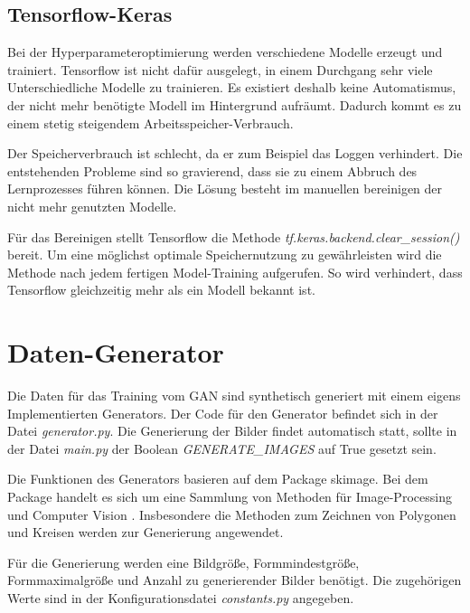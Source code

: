 \subsection{Tensorflow-Keras}
Bei der Hyperparameteroptimierung werden verschiedene Modelle erzeugt und trainiert.
Tensorflow ist nicht dafür ausgelegt, in einem Durchgang sehr viele Unterschiedliche Modelle zu trainieren.
Es existiert deshalb keine Automatismus, der nicht mehr benötigte Modell im Hintergrund aufräumt.
Dadurch kommt es zu einem stetig steigendem Arbeitsspeicher-Verbrauch.
\newline

Der Speicherverbrauch ist schlecht, da er zum Beispiel das Loggen verhindert.
Die entstehenden Probleme sind so gravierend, dass sie zu einem Abbruch des Lernprozesses führen können.
Die Lösung besteht im manuellen bereinigen der nicht mehr genutzten Modelle.
\newline

Für das Bereinigen stellt Tensorflow die Methode \textit{tf.keras.backend.clear\_session()} bereit.
Um eine möglichst optimale Speichernutzung zu gewährleisten wird die Methode nach jedem fertigen Model-Training aufgerufen.
So wird verhindert, dass Tensorflow gleichzeitig mehr als ein Modell bekannt ist.

\section{Daten-Generator}
Die Daten für das Training vom GAN sind synthetisch generiert mit einem eigens Implementierten Generators.
Der Code für den Generator befindet sich in der Datei \textit{generator.py}.
Die Generierung der Bilder findet automatisch statt, sollte in der Datei \textit{main.py} der Boolean \textit{GENERATE\_IMAGES} auf True gesetzt sein.
\newline

Die Funktionen des Generators basieren auf dem Package skimage.
Bei dem Package handelt es sich um eine Sammlung von Methoden für Image-Processing und Computer Vision .
Insbesondere die Methoden zum Zeichnen von Polygonen und Kreisen werden zur Generierung angewendet.
\newline

Für die Generierung werden eine Bildgröße, Formmindestgröße, Formmaximalgröße und Anzahl zu generierender Bilder benötigt.
Die zugehörigen Werte sind in der Konfigurationsdatei \textit{constants.py} angegeben.

